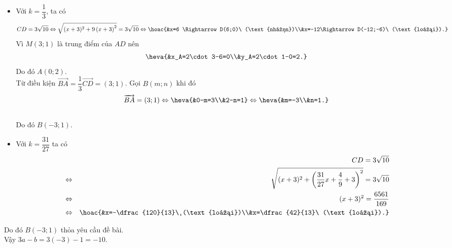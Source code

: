 \begin{ex}
{\begin{itemize}
\item Với $k=\dfrac{1}{3}$, ta có 
\[ CD=3\sqrt{10}\Leftrightarrow \sqrt{(x+3)^2+9\left(x+3\right)^2}=3\sqrt{10}\Leftrightarrow \hoac{&x=6 \Rightarrow D(6;0)\ (\text{nhận})\\&x=-12\Rightarrow D(-12;-6)\ (\text{loại}).}\]
Vì $M(3;1)$ là trung điểm của $AD$ nên
\[\heva{&x_A=2\cdot 3-6=0\\&y_A=2\cdot 1-0=2.}\]
Do đó $A(0;2)$.\\
Từ điều kiện $\overrightarrow{BA}=\dfrac{1}{3}\overrightarrow{CD}=(3;1)$. Gọi $B(m;n)$ khi đó
\[\overrightarrow{BA}=(3;1)\Leftrightarrow \heva{&0-m=3\\&2-n=1}\Leftrightarrow \heva{&m=-3\\&n=1.}\]\\
Do đó  $B(-3;1)$.
\item Với $k=\dfrac{31}{27}$ ta có 
\begin{eqnarray*}
& &CD=3\sqrt{10}\\
&\Leftrightarrow& \sqrt{(x+3)^2+\left(\dfrac{31}{27}x+\dfrac{4}{9}+3\right)^2}=3\sqrt{10}\\
&\Leftrightarrow& (x+3)^2=\dfrac{6561}{169}\\
&\Leftrightarrow& \hoac{&x=-\dfrac{120}{13}\ (\text{loại})\\&x=\dfrac{42}{13}\ (\text{loại}).}
\end{eqnarray*}
\end{itemize}
Do đó  $B(-3;1)$ thỏa yêu cầu đề bài.\\
Vậy  $3a-b=3(-3)-1=-10$.

}
\end{ex}


